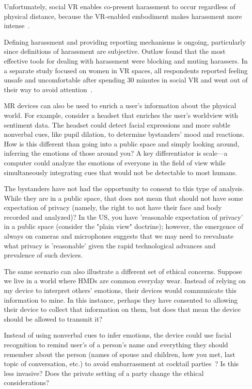 Unfortunately, social VR enables co-present harassment to occur regardless of physical distance, because the VR-enabled embodiment  makes harassment more intense~\cite{blackwell}.

Defining harassment and providing reporting mechanisms is ongoing, particularly since definitions of harassment are subjective. Outlaw found that the most effective tools for dealing with harassment were blocking and muting harassers. In a separate study focused on women in VR spaces, all respondents reported feeling unsafe and uncomfortable after spending 30 minutes in social VR and went out of their way to avoid attention~\cite{outlaw2017}.

MR devices can also be used to enrich a user's information about the physical world. For example, consider a headset that enriches the user's worldview with sentiment data. The headset could detect facial expressions and more subtle nonverbal cues, like pupil dilation, to determine bystanders' mood and reactions. How is this different than going into a public space and simply looking around, inferring the emotions of those around you? A key differentiator is scale---a computer could analyze the emotions of everyone in the field of view while simultaneously integrating cues that would not be detectable to most humans.

The bystanders have not had the opportunity to consent to this type of analysis. While they are in a public space, that does not mean that should not have some expectation of privacy (namely, the right to not have their face and body recorded and analyzed)? In the US, you have 'reasonable expectation of privacy' in a public space (consider the "plain view" doctrine); however, the emergence of always on cameras and microphones suggests that we may need to reevaluate what privacy is 'reasonable' given the rapid technological advances and prevalence of such devices.

The same scenario can also illustrate a different set of ethical concerns. Suppose we live in a world where HMDs are common everyday wear. Instead of relying on my device to interpret others' emotions, their devices would communicate this information to mine. In this instance, perhaps they have consented to allowing their device to collect that information on them, but does that mean the device should be allowed to transmit it?

Instead of using nonverbal cues to infer emotions, the device could use facial recognition to remind user's of a person's name and everything they should remember about the person (names of spouse and children, how you met, last topic of conversation, etc.) to avoid embarrassment at cocktail parties~\cite{wassom2014augmented}? Is this less invasive? Does the private setting of a party change the ethical considerations?

